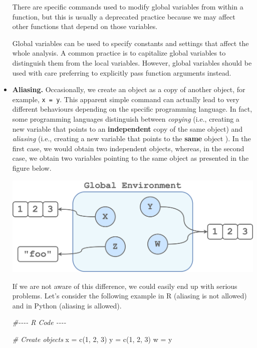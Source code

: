 \documentclass[
  11pt,
]{book}
\newenvironment{Shaded}{\begin{snugshade}}{\end{snugshade}}
\newcommand{\CommentTok}[1]{\textcolor[rgb]{0.56,0.35,0.01}{\textit{#1}}}
\newcommand{\DecValTok}[1]{\textcolor[rgb]{0.00,0.00,0.81}{#1}}
\newcommand{\FunctionTok}[1]{\textcolor[rgb]{0.00,0.00,0.00}{#1}}
\newcommand{\NormalTok}[1]{#1}
\newcommand{\OtherTok}[1]{\textcolor[rgb]{0.56,0.35,0.01}{#1}}
\begin{document}
\begin{itemize}
  There are specific commands used to modify global variables from within a function, but this is usually a deprecated practice because we may affect other functions that depend on those variables.

  Global variables can be used to specify constants and settings that affect the whole analysis. A common practice is to capitalize global variables to distinguish them from the local variables. However, global variables should be used with care preferring to explicitly pass function arguments instead.
\item
  \textbf{Aliasing.} Occasionally, we create an object as a copy of another object, for example, \texttt{x\ =\ y}. This apparent simple command can actually lead to very different behaviours depending on the specific programming language. In fact, some programming languages distinguish between \emph{copying} (i.e., creating a new variable that points to an \textbf{independent} copy of the same object) and \emph{aliasing} (i.e., creating a new variable that points to the \textbf{same} object ). In the first case, we would obtain two independent objects, whereas, in the second case, we obtain two variables pointing to the same object as presented in the figure below.

  \begin{center}\includegraphics[width=0.95\linewidth]{images/coding/glob-env} \end{center}

  If we are not aware of this difference, we could easily end up with serious problems. Let's consider the following example in R (aliasing is not allowed) and in Python (aliasing is allowed).

\begin{Shaded}
\begin{Highlighting}[]
\CommentTok{\#{-}{-}{-}{-}    R Code    {-}{-}{-}{-}}

\CommentTok{\# Create objects}
\NormalTok{x }\OtherTok{=} \FunctionTok{c}\NormalTok{(}\DecValTok{1}\NormalTok{, }\DecValTok{2}\NormalTok{, }\DecValTok{3}\NormalTok{)}
\NormalTok{y }\OtherTok{=} \FunctionTok{c}\NormalTok{(}\DecValTok{1}\NormalTok{, }\DecValTok{2}\NormalTok{, }\DecValTok{3}\NormalTok{)}
\NormalTok{w }\OtherTok{=}\NormalTok{ y}


\end{Highlighting}
\end{Shaded}
\end{itemize}
\end{document}
